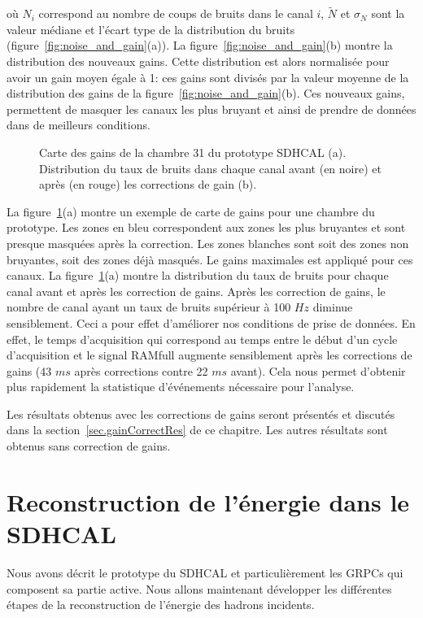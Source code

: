 où $N_i$ correspond au nombre de coups de bruits dans le canal $i$, $\tilde N$ et $\sigma_N$ sont la valeur médiane et l'écart type de la distribution du bruits (figure~\ref{fig:noise_and_gain}(a)). La figure~\ref{fig:noise_and_gain}(b) montre la distribution des nouveaux gains. Cette distribution est alors normalisée pour avoir un gain moyen égale à 1: ces gains sont divisés par la valeur moyenne de la distribution des gains de la figure~\ref{fig:noise_and_gain}(b). Ces nouveaux gains, permettent de masquer les canaux les plus bruyant et ainsi de prendre de données dans de meilleurs conditions. 
\begin{figure}[!ht]
  \caption{Carte des gains de la chambre 31 du prototype SDHCAL (a). Distribution du taux de bruits dans chaque canal avant (en noire) et après (en rouge) les corrections de gain (b).\label{fig:map_and_rate}}
\end{figure}
La figure~\ref{fig:map_and_rate}(a) montre un exemple de carte de gains pour une chambre du prototype. Les zones en bleu correspondent aux zones les plus bruyantes et sont presque masquées après la correction. Les zones blanches sont soit des zones non bruyantes, soit des zones déjà masqués. Le gains maximales est appliqué pour ces canaux. La figure~\ref{fig:map_and_rate}(a) montre la distribution du taux de bruits pour chaque canal avant et après les correction de gains. Après les correction de gains, le nombre de canal ayant un taux de bruits supérieur à 100 $Hz$ diminue sensiblement. Ceci a pour effet d'améliorer nos conditions de prise de données. En effet, le temps d'acquisition qui correspond au temps entre le début d'un cycle d'acquisition et le signal RAMfull augmente sensiblement après les corrections de gains (43 $ms$ après corrections contre 22 $ms$ avant). Cela nous permet d'obtenir plus rapidement la statistique d’événements nécessaire pour l'analyse.

Les résultats obtenus avec les corrections de gains seront présentés et discutés dans la  section~\ref{sec.gainCorrectRes} de ce chapitre. Les autres résultats sont obtenus sans correction de gains.


\section{Reconstruction de l'énergie dans le SDHCAL}
Nous avons décrit le prototype du SDHCAL et particulièrement les GRPCs qui composent sa partie active. Nous allons maintenant développer les différentes étapes de la reconstruction de l'énergie des hadrons incidents.
